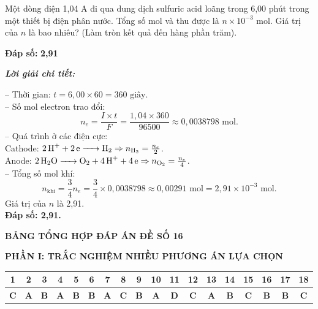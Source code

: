 \documentclass[11pt,a4paper]{article}
\def\loigiai#1{
\par\begingroup\color{blue!80!black}\small
\noindent\textbf{\textit{Lời giải chi tiết:}}\par
#1\par\endgroup}
\begin{document}
\begin{ex}
Một dòng điện 1,04 A đi qua dung dịch sulfuric acid loãng trong 6,00 phút trong một thiết bị điện phân nước. Tổng số mol  và  thu được là $n \times 10^{-3}\text{ mol}$. Giá trị của $n$ là bao nhiêu? (Làm tròn kết quả đến hàng phần trăm).
\par\noindent\textbf{Đáp số:} \textbf{\color{red}2,91}
\loigiai{
-- Thời gian: $t = 6{,}00 \times 60 = 360\text{ giây}$.\\
-- Số mol electron trao đổi:
$$n_e = \frac{I \times t}{F} = \frac{1{,}04 \times 360}{96500} \approx 0{,}0038798\text{ mol.}$$
-- Quá trình ở các điện cực:\\
Cathode: $\ce{2H+ + 2e -> H2} \Rightarrow n_{\ce{H2}} = \frac{n_e}{2}$.\\
Anode: $\ce{2H2O -> O2 + 4H+ + 4e} \Rightarrow n_{\ce{O2}} = \frac{n_e}{4}$.\\
-- Tổng số mol khí:
$$n_{\text{khí}} = \frac{3}{4} n_e = \frac{3}{4} \times 0{,}0038798 \approx 0{,}00291\text{ mol} = 2{,}91 \times 10^{-3}\text{ mol.}$$
Giá trị của $n$ là 2,91.\\
\textbf{Đáp số: 2,91.}}
\end{ex}



\vspace{0.5cm}
\begin{center}
	\textbf{\Large\color{mainGreen}BẢNG TỔNG HỢP ĐÁP ÁN ĐỀ SỐ 16}
\end{center}

\vspace{0.2cm}
\noindent\textbf{\color{mainGreen}PHẦN I: TRẮC NGHIỆM NHIỀU PHƯƠNG ÁN LỰA CHỌN}
\begin{center}
\renewcommand{\arraystretch}{1.2}
\begin{tabular}{|c|c|c|c|c|c|c|c|c|c|c|c|c|c|c|c|c|c|}
\hline
\textbf{1} & \textbf{2} & \textbf{3} & \textbf{4} & \textbf{5} & \textbf{6} & \textbf{7} & \textbf{8} & \textbf{9} & \textbf{10} & \textbf{11} & \textbf{12} & \textbf{13} & \textbf{14} & \textbf{15} & \textbf{16} & \textbf{17} & \textbf{18} \\ \hline
\textbf{\color{red}C} & \textbf{\color{red}A} & \textbf{\color{red}B} & \textbf{\color{red}A} & \textbf{\color{red}B} & \textbf{\color{red}B} & \textbf{\color{red}A} & \textbf{\color{red}C} & \textbf{\color{red}B} & \textbf{\color{red}A} & \textbf{\color{red}D} & \textbf{\color{red}C} & \textbf{\color{red}A} & \textbf{\color{red}B} & \textbf{\color{red}C} & \textbf{\color{red}B} & \textbf{\color{red}B} & \textbf{\color{red}C} \\ \hline
\end{tabular}
\end{center}
\end{document}
